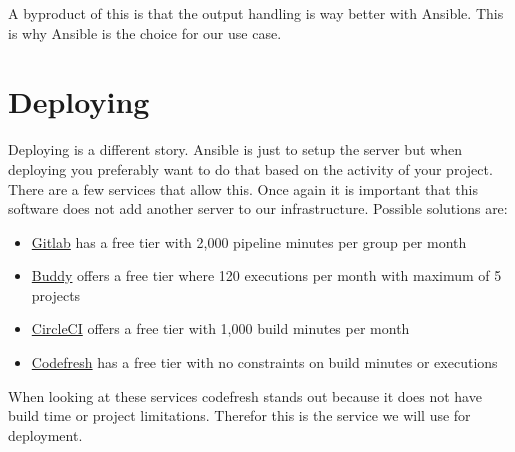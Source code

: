 A byproduct of this is that the output handling is way better with Ansible. This is why Ansible is the choice for our use case.

\section{Deploying}
Deploying is a different story. Ansible is just to setup the server but when deploying you preferably want to do that based on the activity of your project. There are a few services that allow this. Once again it is important that this software does not add another server to our infrastructure. Possible solutions are:
\begin{itemize}
  \item \href{https://about.gitlab.com/}{Gitlab} has a free tier with 2,000 pipeline minutes per group per month \cite{gitlabFreeTier}
  \item \href{https://buddy.works/}{Buddy} offers a free tier where 120 executions per month with maximum of 5 projects \cite{buddyFreeTier}
  \item \href{https://circleci.com/}{CircleCI} offers a free tier with 1,000 build minutes per month \cite{circleCIFreeTier}
  \item \href{https://codefresh.io/}{Codefresh} has a free tier with no constraints on build minutes or executions \cite{codefreshFreeTier}
\end{itemize}

When looking at these services codefresh stands out because it does not have build time or project limitations. Therefor this is the service we will use for deployment.
